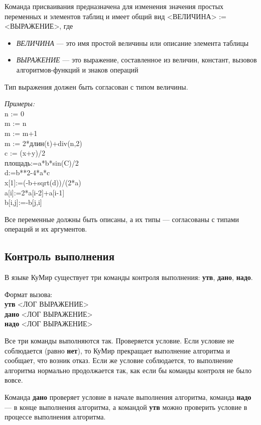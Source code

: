 \documentclass[12pt,a4paper]{article}
\begin{document}
Команда присваивания предназначена для изменения значения простых переменных и элементов таблиц и имеет общий вид \textsf{<ВЕЛИЧИНА> := <ВЫРАЖЕНИЕ>}, где
\begin{itemize}
\item \emph{ВЕЛИЧИНА} --- это имя простой величины или описание элемента таблицы
\item \emph{ВЫРАЖЕНИЕ} --- это выражение, составленное из величин, констант, вызовов ал\-го\-рит\-мов-функ\-ций и знаков операций
\end{itemize}

Тип выражения должен быть согласован с типом величины.

\emph{Примеры:}\\
{\sffamily
n := 0\\
m := n\\
m := m+1\\
m := 2*длин(t)+div(n,2)\\
c := (x+y)/2\\
площадь:=a*b*sin(C)/2\\
d:=b**2-4*a*c\\
x[1]:=(-b+sqrt(d))/(2*a)\\
a[i]:=2*a[i-2]+a[i-1]\\
b[i,j]:=-b[j,i]
}

Все переменные должны быть описаны, а их типы --- согласованы с типами операций и их аргументов.

\subsection{Контроль выполнения}

В языке КуМир существует три команды контроля выполнения: \textbf{утв}, \textbf{дано}, \textbf{надо}.

	Формат вызова:\\
{\sffamily
\textbf{утв} <ЛОГ ВЫРАЖЕНИЕ>\\
\textbf{дано} <ЛОГ ВЫРАЖЕНИЕ>\\
\textbf{надо} <ЛОГ ВЫРАЖЕНИЕ>
}
	
	Все три команды выполняются так. Проверяется условие. Если условие не соблюдается (равно \textbf{нет}), то КуМир прекращает выполнение алгоритма и сообщает, что возник отказ. Если же условие соблюдается, то выполнение алгоритма нормально продолжается так, как если бы команды контроля не было вовсе.

	Команда \textbf{дано} проверяет условие в начале выполнения алгоритма, команда \textbf{надо} --- в конце выполнения алгоритма, а командой \textbf{утв} можно проверить условие в процессе выполнения алгоритма.
	
\end{document}

